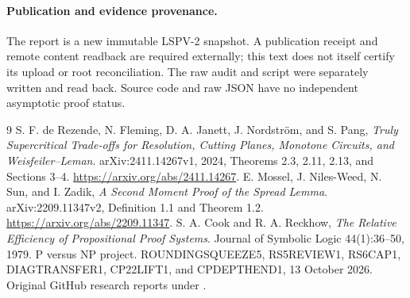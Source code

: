 \documentclass[11pt]{article}
\begin{document}
\paragraph{Publication and evidence provenance.}
The report is a new immutable LSPV-2 snapshot. A publication
receipt and remote content readback are required externally;
this text does not itself certify its upload or root
reconciliation. The raw audit and script were separately
written and read back. Source code and raw JSON have
no independent asymptotic proof status.

\begin{thebibliography}{9}
S. F. de Rezende, N. Fleming, D. A. Janett, J. Nordstr\"om,
and S. Pang,
\emph{Truly Supercritical Trade-offs for Resolution, Cutting Planes,
Monotone Circuits, and Weisfeiler--Leman}.
arXiv:2411.14267v1, 2024, Theorems 2.3, 2.11, 2.13,
and Sections 3--4. \url{https://arxiv.org/abs/2411.14267}.
E. Mossel, J. Niles-Weed, N. Sun, and I. Zadik,
\emph{A Second Moment Proof of the Spread Lemma}.
arXiv:2209.11347v2, Definition 1.1 and Theorem 1.2.
\url{https://arxiv.org/abs/2209.11347}.
S. A. Cook and R. A. Reckhow,
\emph{The Relative Efficiency of Propositional Proof Systems}.
Journal of Symbolic Logic 44(1):36--50, 1979.
P versus NP project.
ROUNDINGSQUEEZE5, RS5REVIEW1, RS6CAP1, DIAGTRANSFER1,
CP22LIFT1, and CPDEPTHEND1, 13 October 2026.
Original GitHub research reports under .
\end{thebibliography}
\end{document}

